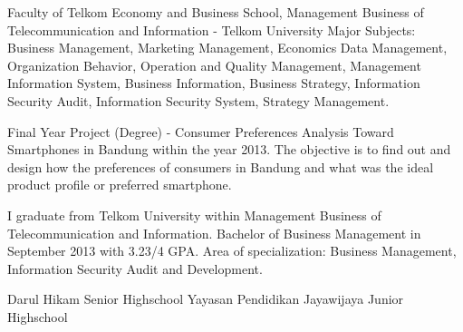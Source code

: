 %
%
%


\begin{scholarship}
					{Faculty of Telkom Economy and Business School, Management Business of Telecommunication and Information - Telkom University
					Major Subjects: Business Management, Marketing Management, Economics
		Data Management,  Organization Behavior, Operation and Quality Management,	
		Management Information System, Business Information, Business Strategy,
		Information Security Audit, Information Security System, Strategy Management.

		Final Year Project (Degree) - Consumer Preferences Analysis Toward 					Smartphones in Bandung within the year 2013.
		The objective is to find out and design how the preferences of consumers in Bandung and what was the ideal product profile or 						preferred smartphone.

		I graduate from Telkom University within Management Business of 						Telecommunication and Information. Bachelor of Business Management 
		in September 2013 with 3.23/4 GPA. Area of specialization: Business 					Management, Information Security Audit and Development.
}
					{Darul Hikam Senior Highschool}
					{Yayasan Pendidikan Jayawijaya Junior Highschool}
\end{scholarship}